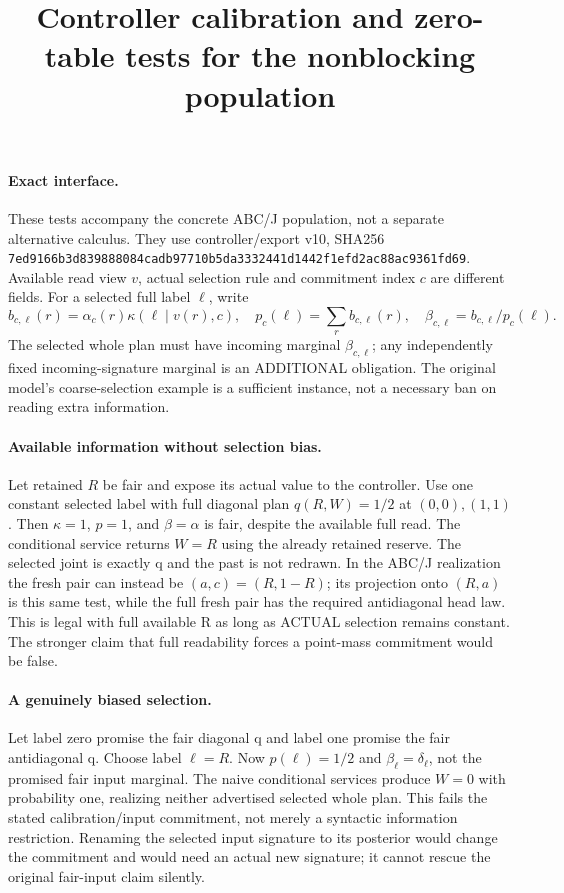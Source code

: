 \documentclass{article}\usepackage{amsmath,amssymb}
\title{Controller calibration and zero-table tests for the nonblocking population}
\begin{document}
\maketitle
\paragraph{Exact interface.} These tests accompany the concrete ABC/J population, not a separate alternative calculus. They use controller/export v10, SHA256 \texttt{7ed9166b3d839888084cadb97710b5da3332441d1442f1efd2ac88ac9361fd69}. Available read view $v$, actual selection rule and commitment index $c$ are different fields. For a selected full label $\ell$, write
\[
 b_{c,\ell}(r)=\alpha_c(r)\kappa(\ell\mid v(r),c),\quad
 p_c(\ell)=\sum_r b_{c,\ell}(r),\quad
 \beta_{c,\ell}=b_{c,\ell}/p_c(\ell).
\]
The selected whole plan must have incoming marginal $\beta_{c,\ell}$; any independently fixed incoming-signature marginal is an ADDITIONAL obligation. The original model's coarse-selection example is a sufficient instance, not a necessary ban on reading extra information.

\paragraph{Available information without selection bias.}
Let retained $R$ be fair and expose its actual value to the controller. Use one constant selected label with full diagonal plan $q(R,W)=1/2$ at $(0,0),(1,1)$. Then $\kappa=1$, $p=1$, and $\beta=\alpha$ is fair, despite the available full read. The conditional service returns $W=R$ using the already retained reserve. The selected joint is exactly q and the past is not redrawn. In the ABC/J realization the fresh pair can instead be $(a,c)=(R,1-R)$; its projection onto $(R,a)$ is this same test, while the full fresh pair has the required antidiagonal head law. This is legal with full available R as long as ACTUAL selection remains constant. The stronger claim that full readability forces a point-mass commitment would be false.

\paragraph{A genuinely biased selection.}
Let label zero promise the fair diagonal q and label one promise the fair antidiagonal q. Choose label $\ell=R$. Now $p(\ell)=1/2$ and $\beta_\ell=\delta_\ell$, not the promised fair input marginal. The naive conditional services produce $W=0$ with probability one, realizing neither advertised selected whole plan. This fails the stated calibration/input commitment, not merely a syntactic information restriction. Renaming the selected input signature to its posterior would change the commitment and would need an actual new signature; it cannot rescue the original fair-input claim silently.
\end{document}
